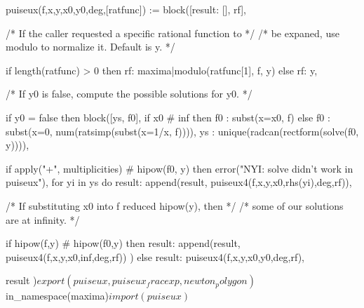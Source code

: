 
\begin{maximablocksmall}
puiseux(f,x,y,x0,y0,deg,[ratfunc]) :=
 block([result: [], rf],

   /* If the caller requested a specific rational function to */
   /* be expaned, use modulo to normalize it.  Default is y. */

   if length(ratfunc) > 0 then
      rf: maxima|modulo(ratfunc[1], f, y)
   else
      rf: y,

   /* If y0 is false, compute the possible solutions for y0. */

   if y0 = false then block([ys, f0],
      if x0 # inf then
         f0 : subst(x=x0, f)
      else
         f0 : subst(x=0, num(ratsimp(subst(x=1/x, f)))),
      ys : unique(radcan(rectform(solve(f0, y)))),

      if apply("+", multiplicities) # hipow(f0, y) then
         error("NYI: solve didn't work in puiseux"),
      for yi in ys do
         result: append(result, puiseux4(f,x,y,x0,rhs(yi),deg,rf)),

      /* If substituting x0 into f reduced hipow(y), then */
      /* some of our solutions are at infinity. */

      if hipow(f,y) # hipow(f0,y) then
         result: append(result, puiseux4(f,x,y,x0,inf,deg,rf))
   ) else
      result: puiseux4(f,x,y,x0,y0,deg,rf),

   result
 )$

export(puiseux, puiseux_fracexp, newton_polygon)$
in_namespace(maxima)$
import(puiseux)$
\end{maximablocksmall}

